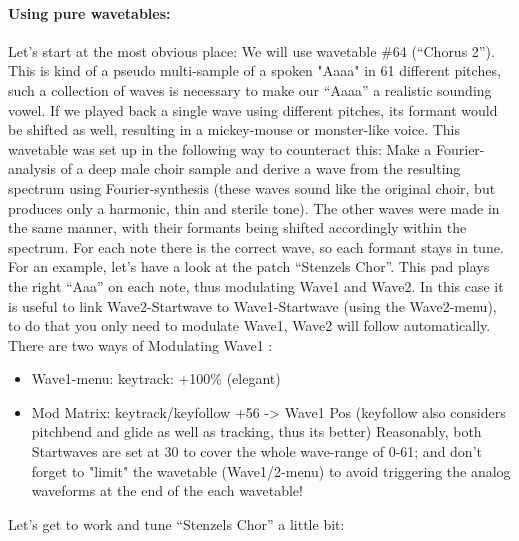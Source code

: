 \paragraph{Using pure wavetables:}
	Let's start at the most obvious place:
	We will use wavetable \#64 (``Chorus 2''). This is kind of a pseudo multi-sample of a spoken "Aaaa" in 61 different pitches, such a collection of waves is necessary to make our ``Aaaa'' a realistic sounding vowel. If we played back a single wave using different pitches, its formant would be shifted as well, resulting in a mickey-mouse or monster-like voice. This wavetable was set up in the following way to counteract this:
	Make a Fourier-analysis of a deep male choir sample and derive a wave from the resulting spectrum using Fourier-synthesis (these waves sound like the original choir, but produces only a harmonic, thin and sterile tone). The other waves were made in the same manner, with their formants being shifted accordingly within the spectrum. For each note there is the correct wave, so each formant stays in tune. For an example, let's have a look at the patch ``Stenzels Chor''. This pad plays the right ``Aaa'' on each note, thus modulating Wave1 and Wave2. In this case it is useful to link Wave2-Startwave to Wave1-Startwave (using the Wave2-menu), to do that you only need to modulate Wave1, Wave2 will follow automatically.\\
	There are two ways of Modulating Wave1 :
	\begin{itemize}
		\item Wave1-menu: keytrack: +100\% (elegant)
		\item Mod Matrix: keytrack/keyfollow +56 -> Wave1 Pos (keyfollow also considers pitchbend and glide as well as tracking, thus its better)
		Reasonably, both Startwaves are set at 30 to cover the whole wave-range of 0-61; and don't forget to "limit" the wavetable (Wave1/2-menu) to avoid triggering the analog waveforms at the end of the each wavetable!
	\end{itemize}
Let's get to work and tune ``Stenzels Chor'' a little bit:
